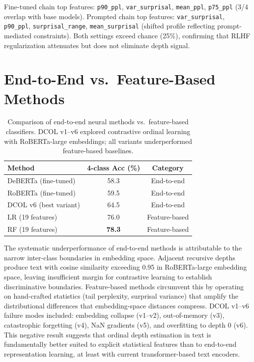 \documentclass[11pt,a4paper]{article}
\begin{document}
Fine-tuned chain top features: \texttt{p90\_ppl}, \texttt{var\_surprisal}, \texttt{mean\_ppl}, \texttt{p75\_ppl} (3/4 overlap with base models). Prompted chain top features: \texttt{var\_surprisal}, \texttt{p90\_ppl}, \texttt{surprisal\_range}, \texttt{mean\_surprisal} (shifted profile reflecting prompt-mediated constraints). Both settings exceed chance (25\%), confirming that RLHF regularization attenuates but does not eliminate depth signal.

\section{End-to-End vs.\ Feature-Based Methods}
\label{app:dcol}

\begin{table}[h]
\centering
\caption{Comparison of end-to-end neural methods vs.\ feature-based classifiers. DCOL v1--v6 explored contrastive ordinal learning with RoBERTa-large embeddings; all variants underperformed feature-based baselines.}
\label{tab:dcol}
\small
\begin{tabular}{lcc}
\toprule
\textbf{Method} & \textbf{4-class Acc (\%)} & \textbf{Category} \\
\midrule
DeBERTa (fine-tuned)     & 58.3 & End-to-end \\
RoBERTa (fine-tuned)     & 59.5 & End-to-end \\
DCOL v6 (best variant)   & 64.5 & End-to-end \\
\midrule
LR (19 features)         & 76.0 & Feature-based \\
RF (19 features)         & \textbf{78.3} & Feature-based \\
\bottomrule
\end{tabular}
\end{table}

The systematic underperformance of end-to-end methods is attributable to the narrow inter-class boundaries in embedding space. Adjacent recursive depths produce text with cosine similarity exceeding 0.95 in RoBERTa-large embedding space, leaving insufficient margin for contrastive learning to establish discriminative boundaries. Feature-based methods circumvent this by operating on hand-crafted statistics (tail perplexity, surprisal variance) that amplify the distributional differences that embedding-space distances compress. DCOL v1--v6 failure modes included: embedding collapse (v1--v2), out-of-memory (v3), catastrophic forgetting (v4), NaN gradients (v5), and overfitting to depth 0 (v6). This negative result suggests that ordinal depth estimation in text is fundamentally better suited to explicit statistical features than to end-to-end representation learning, at least with current transformer-based text encoders.
\end{document}
